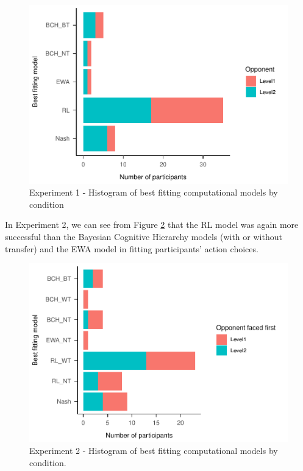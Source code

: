 \documentclass[smallextended]{svjour3}       %
\begin{document}
\begin{figure}

{\centering \includegraphics[width=\textwidth]{CBB_files/figure-latex/exp1-comp-models-1} 

}

\caption{Experiment 1 - Histogram of best fitting computational models by condition}\label{fig:exp1-comp-models}
\end{figure}

In Experiment 2, we can see from Figure \ref{fig:exp2-comp-models} that
the RL model was again more successful than the Bayesian Cognitive
Hierarchy models (with or without transfer) and the EWA model in fitting
participants' action choices.

\begin{figure}

{\centering \includegraphics[width=\textwidth]{CBB_files/figure-latex/exp2-comp-models-1} 

}

\caption{Experiment 2 - Histogram of best fitting computational models by condition.}\label{fig:exp2-comp-models}
\end{figure}
\end{document}
